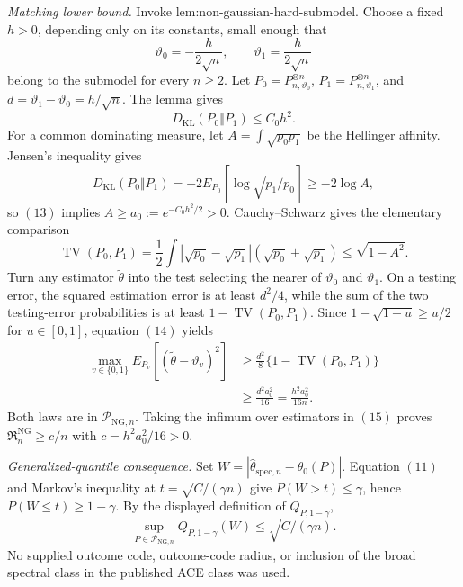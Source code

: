 \emph{Matching lower bound.}
Invoke \(\text{lem:non-gaussian-hard-submodel}\).  Choose a fixed \(h>0\), depending only on its constants, small enough that
\[
 \vartheta_0=-\frac{h}{2\sqrt n},
 \qquad
 \vartheta_1=\frac{h}{2\sqrt n}
\]
belong to the submodel for every \(n\ge2\).  Let \(P_0=P_{n,\vartheta_0}^{\otimes n}\), \(P_1=P_{n,\vartheta_1}^{\otimes n}\), and \(d=\vartheta_1-\vartheta_0=h/\sqrt n\).  The lemma gives
\[
 D_{\mathrm{KL}}(P_0\Vert P_1)\le C_0h^2. \tag{13}
\]
For a common dominating measure, let \(A=\int\sqrt{p_0p_1}\) be the Hellinger affinity.  Jensen's inequality gives
\[
 D_{\mathrm{KL}}(P_0\Vert P_1)
 =-2E_{P_0}\!\left[\log\sqrt{p_1/p_0}\right]
 \ge-2\log A,
\]
so \((13)\) implies \(A\ge a_0:=e^{-C_0h^2/2}>0\).  Cauchy--Schwarz gives the elementary comparison
\[
 \operatorname{TV}(P_0,P_1)
 =\frac12\int|\sqrt{p_0}-\sqrt{p_1}|
                  (\sqrt{p_0}+\sqrt{p_1})
 \le\sqrt{1-A^2}. \tag{14}
\]
Turn any estimator \(\widetilde\theta\) into the test selecting the nearer of \(\vartheta_0\) and \(\vartheta_1\).  On a testing error, the squared estimation error is at least \(d^2/4\), while the sum of the two testing-error probabilities is at least \(1-\operatorname{TV}(P_0,P_1)\).  Since \(1-\sqrt{1-u}\ge u/2\) for \(u\in[0,1]\), equation \((14)\) yields
\[
 \begin{aligned}
 \max_{v\in\{0,1\}}
 E_{P_v}[(\widetilde\theta-\vartheta_v)^2]
 &\ge\frac{d^2}{8}\{1-\operatorname{TV}(P_0,P_1)\}\\
 &\ge\frac{d^2a_0^2}{16}
 =\frac{h^2a_0^2}{16n}.
 \end{aligned} \tag{15}
\]
Both laws are in \(\mathcal P_{\mathrm{NG},n}\).  Taking the infimum over estimators in \((15)\) proves \(\mathfrak R_n^{\mathrm{NG}}\ge c/n\) with \(c=h^2a_0^2/16>0\).

\emph{Generalized-quantile consequence.}
Set \(W=|\widehat\theta_{\mathrm{spec},n}-\theta_0(P)|\).  Equation \((11)\) and Markov's inequality at \(t=\sqrt{C/(\gamma n)}\) give \(P(W>t)\le\gamma\), hence \(P(W\le t)\ge1-\gamma\).  By the displayed definition of \(Q_{P,1-\gamma}\),
\[
 \sup_{P\in\mathcal P_{\mathrm{NG},n}}
 Q_{P,1-\gamma}(W)
 \le\sqrt{C/(\gamma n)}.
\]
No supplied outcome code, outcome-code radius, or inclusion of the broad spectral class in the published ACE class was used.